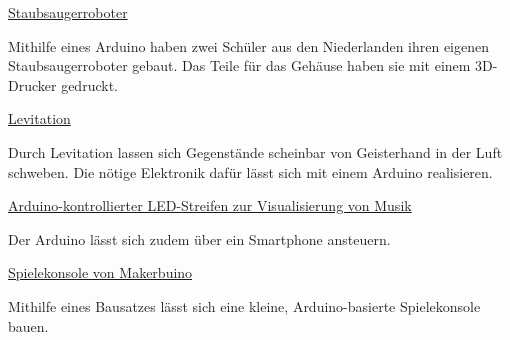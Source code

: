 \vfill
\begin{links}
	\item \href{https://www.heise.de/make/meldung/Schueler-Projekt-Selbstbau-Staubsaugerroboter-aus-dem-3D-Drucker-3991208.html}{Staubsaugerroboter}
	
	Mithilfe eines Arduino haben zwei Schüler aus den Niederlanden ihren eigenen Staubsaugerroboter gebaut. Das Teile für das Gehäuse haben sie mit einem 3D-Drucker gedruckt.
	
	\item \href{https://www.heise.de/make/artikel/Einfacher-Ultraschall-Levitationsapparat-4022505.html}{Levitation}
	
	Durch Levitation lassen sich Gegenstände scheinbar von Geisterhand in der Luft schweben. Die nötige Elektronik dafür lässt sich mit einem Arduino realisieren.
	
	\item \href{https://www.instructables.com/id/Party-Lights-1/}{Arduino-kontrollierter LED-Streifen zur Visualisierung von Musik}
	
	Der Arduino lässt sich zudem über ein Smartphone ansteuern.
	
	\item \href{https://www.heise.de/make/meldung/Makerbuino-Spielkonsole-fuer-den-Eigenbau-3681578.html}{Spielekonsole von Makerbuino}
	
	Mithilfe eines Bausatzes lässt sich eine kleine, Arduino-basierte Spielekonsole bauen.
\end{links}